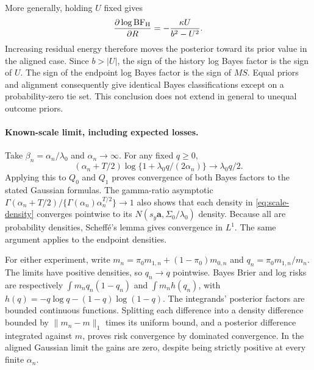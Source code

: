More generally, holding $U$ fixed gives
\[
 \frac{\partial\log\mathrm{BF}_{\rm H}}{\partial R}
 =-\frac{\kappa U}{b^2-U^2}.
\]
Increasing residual energy therefore moves the posterior toward its prior
value in the aligned case. Since $b>|U|$, the sign of the history log
Bayes factor is the sign of $U$. The sign of the endpoint log Bayes factor
is the sign of $MS$. Equal priors and alignment consequently give identical
Bayes classifications except on a probability-zero tie set. This conclusion
does not extend in general to unequal outcome priors.

\paragraph{Known-scale limit, including expected losses.}
Take $\beta_n=\alpha_n/\lambda_0$ and $\alpha_n\to\infty$. For any fixed
$q\geq0$,
\[
 (\alpha_n+T/2)\log\{1+\lambda_0q/(2\alpha_n)\}
 \longrightarrow\lambda_0q/2.
\]
Applying this to $Q_0$ and $Q_1$ proves convergence of both Bayes factors
to the stated Gaussian formulas. The gamma-ratio asymptotic
$\Gamma(\alpha_n+T/2)/\{\Gamma(\alpha_n)\alpha_n^{T/2}\}\to1$
also shows that each density in \eqref{eq:scale-density} converges pointwise
to its $N(s_y\boldsymbol a,\Sigma_0/\lambda_0)$ density. Because all are
probability densities, Scheff\'e's lemma gives convergence in $L^1$.
The same argument applies to the endpoint densities.

For either experiment, write $m_n=\pi_0m_{1,n}+(1-\pi_0)m_{0,n}$ and
$q_n=\pi_0m_{1,n}/m_n$. The limits have positive densities, so $q_n\to q$
pointwise. Bayes Brier and log risks are respectively
$\int m_n q_n(1-q_n)$ and $\int m_n h(q_n)$, with
$h(q)=-q\log q-(1-q)\log(1-q)$. The integrands' posterior factors are
bounded continuous functions. Splitting each difference into a density
difference bounded by $\|m_n-m\|_1$ times its uniform bound, and a
posterior difference integrated against $m$, proves risk convergence by
dominated convergence. In the aligned Gaussian limit the gains are zero,
despite being strictly positive at every finite $\alpha_n$.
